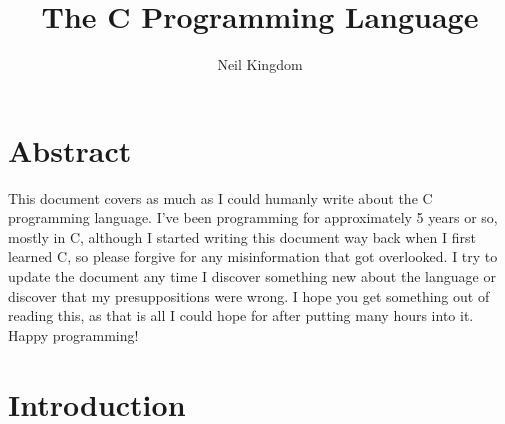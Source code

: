 \documentclass{article}
\title{The C Programming Language}
\author{Neil Kingdom}
\begin{document}
\begin{titlingpage}

\maketitle

\end{titlingpage}

\newpage

\tableofcontents

\newpage

\section{Abstract}

This document covers as much as I could humanly write about the C programming language. I’ve been programming
for approximately 5 years or so, mostly in C, although I started writing this document way back when I first
learned C, so please forgive for any misinformation that got overlooked. I try to update the document any time
I discover something new about the language or discover that my presuppositions were wrong. I hope you get
something out of reading this, as that is all I could hope for after putting many hours into it. Happy
programming!

\section{Introduction}
\end{document}
